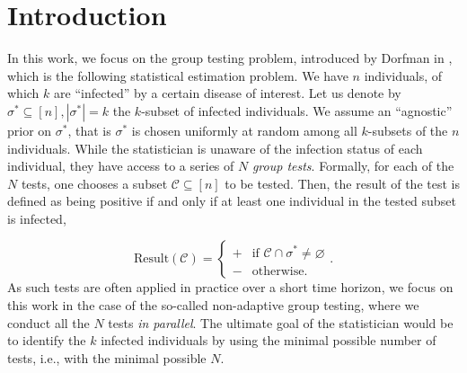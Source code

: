 \documentclass[12pt,reqno]{amsart}
\numberwithin{equation}{section}
\theoremstyle{definition}
\renewcommand{\[}{\begin{equation}}
\renewcommand{\]}{\end{equation}}
\newcommand{\scr}{\mathcal}
\renewcommand{\|}{\bigg{|}}
\begin{document}

\maketitle

\date{\today}
 \newpage
\tableofcontents

\section{Introduction}


In this work, we focus on the group testing problem, introduced by Dorfman in \cite{Dorfman_1943}, which is the following statistical estimation problem. We have \( n \) individuals, of which \( k \) are ``infected'' by a certain disease of interest. Let us denote by $\sigma^* \subseteq [n], |\sigma^*|=k$ the $k$-subset of infected individuals. We assume an ``agnostic'' prior on $\sigma^*$, that is $\sigma^*$ is chosen uniformly at random among all $k$-subsets of the $n$ individuals. While the statistician is unaware of the infection status of each individual, they have access to a series of $N$ \emph{group tests}. Formally, for each of the $N$ tests, one chooses a subset \( \scr{C} \subseteq [n] \) to be tested. Then, the result of the test is defined as being positive if and only if at least one individual in the tested subset is infected,

\[
\text{Result}(\scr{C}) = \begin{cases}
    + & \text{if } \scr{C} \cap \sigma^* \not = \varnothing\\ 
    - & \text{otherwise}.
\end{cases}.
\]
As such tests are often applied in practice over a short time horizon, we focus on this work in the case of the so-called non-adaptive group testing, where we conduct all the \( N \) tests \emph{in parallel}. The ultimate goal of the statistician would be to identify the $k$ infected individuals by using the minimal possible number of tests, i.e., with the minimal possible $N$.
\end{document}
